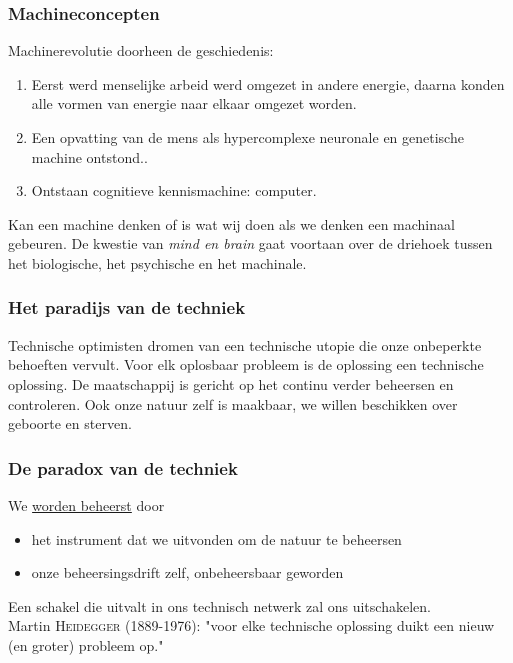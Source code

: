 \documentclass[11pt,a4paper]{article}
\begin{document}
\subsubsection*{Machineconcepten}
Machinerevolutie doorheen de geschiedenis:
\begin{enumerate}
\item Eerst werd menselijke arbeid werd omgezet in andere energie, daarna konden alle vormen van energie naar elkaar omgezet worden.
\item Een opvatting van de mens als hypercomplexe neuronale en genetische machine ontstond..
\item Ontstaan cognitieve kennismachine: computer.
\end{enumerate}
Kan een machine denken of is wat wij doen als we denken een machinaal gebeuren. De kwestie van \textit{mind en brain} gaat voortaan over de driehoek tussen het biologische, het psychische en het machinale.
\subsubsection*{Het paradijs van de techniek}
Technische optimisten dromen van een technische utopie die onze onbeperkte behoeften vervult. Voor elk oplosbaar probleem is de oplossing een technische oplossing. De maatschappij is gericht op het continu verder beheersen en controleren. Ook onze natuur zelf is maakbaar, we willen beschikken over geboorte en sterven.
\subsubsection*{De paradox van de techniek}
We \underline{worden beheerst} door
\begin{itemize}
\item het instrument dat we uitvonden om de natuur te beheersen
\item onze beheersingsdrift zelf, onbeheersbaar geworden
\end{itemize}
Een schakel die uitvalt in ons technisch netwerk zal ons uitschakelen. 
\\Martin \textsc{Heidegger} (1889-1976): "voor elke technische oplossing duikt een nieuw (en groter) probleem op."
\end{document}

